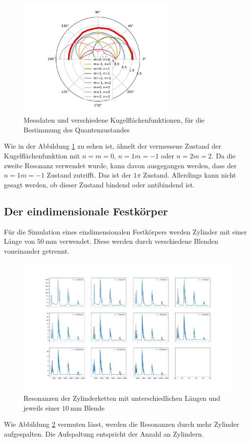 \begin{figure}
    \centering
    \includegraphics[width = 0.7\textwidth, keepaspectratio]{figure/WMQZ.pdf}
    \caption{Messdaten und verschiedene Kugelflächenfunktionen, für die Bestimmung des Quantenzustandes}
    \label{fig:WMQZ}
\end{figure}
\FloatBarrier
Wie in der Abbildung \ref{fig:WMQZ} zu sehen ist, ähnelt der vermessene Zustand der Kugelflächenfunktion mit 
$n=m=0$, $n=1 m=-1$ oder $n=2 m=2$. Da die zweite Resonanz verwendet wurde, kann davon ausgegangen werden, dass der 
$n=1 m=-1$ Zustand zutrifft. Das ist der $1\pi$ Zustand. Allerdings kann nicht gesagt werden, ob dieser Zustand bindend oder antibindend 
ist.

\subsection{Der eindimensionale Festkörper}
Für die Simulation eines eindimensionalen Festkörpers werden Zylinder mit einer 
Länge von $\SI{50}{\milli\meter}$ verwendet. Diese werden durch verschiedene Blenden voneinander getrennt.
\FloatBarrier
\begin{figure}
    \centering
    \includegraphics[width=\textwidth,keepaspectratio]{figure/Zylinder_Ketten.pdf}
    \caption{Resonanzen der Zylinderketten mit unterschiedlichen Längen und jeweils einer $\SI{10}{\milli\meter}$ Blende}
    \label{fig:Zylinder_Ketten}
\end{figure}
\FloatBarrier
Wie Abbildung \ref{fig:Zylinder_Ketten} vermuten lässt, werden die Resonanzen durch mehr Zylinder aufgespalten. Die 
Aufspaltung entspricht der Anzahl an Zylindern.


